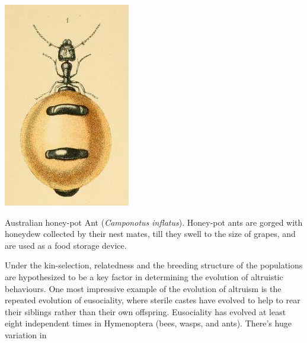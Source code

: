  \begin{marginfigure}
\begin{center}
\includegraphics[width= 0.7 \textwidth]{illustration_images/Quant_gen/honey_ant/honey_ant.png}
\end{center}
\caption{Australian honey-pot Ant ({\it Camponotus inflatus}). Honey-pot ants are gorged with
  honeydew collected by their nest mates, till they swell to the size
  of grapes, and are used as a food storage
  device.    } \label{fig:honey_ant}
\end{marginfigure} 
%
Under the kin-selection, relatedness and the breeding structure of the populations are
hypothesized to be a key factor in determining the evolution of altruistic behaviours. 
One most impressive example of the evolution of altruism is the
repeated evolution of eusociality, where sterile castes have evolved
to help to rear their siblings rather than their own offspring. Eusociality has evolved at least eight independent times in
 Hymenoptera (bees, wasps, and ants). There's huge variation in
